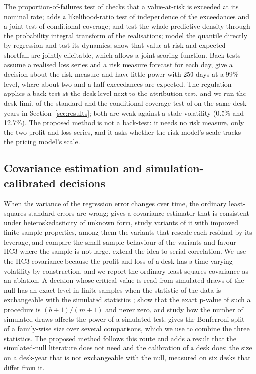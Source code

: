The proportion-of-failures test of \citet{kupiec1995} checks that a value-at-risk is exceeded at its nominal rate; \citet{christoffersen1998} adds a likelihood-ratio test of independence of the exceedances and a joint test of conditional coverage; \citet{berkowitz2001} and \citet{diebold1998} test the whole predictive density through the probability integral transform of the realisations; \citet{engle2004} model the quantile directly by regression and test its dynamics; \citet{fissler2016} show that value-at-risk and expected shortfall are jointly elicitable, which allows a joint scoring function.
Back-tests assume a realised loss series and a risk measure forecast for each day, give a decision about the risk measure and have little power with 250 days at a 99\% level, where about two and a half exceedances are expected.
The regulation applies a back-test at the desk level next to the attribution test, and we run the desk limit of the standard and the conditional-coverage test of \citet{christoffersen1998} on the same desk-years in Section~\ref{sec:results}; both are weak against a stale volatility (0.5\% and 12.7\%).
The proposed method is not a back-test: it needs no risk measure, only the two profit and loss series, and it asks whether the risk model's scale tracks the pricing model's scale.

\subsection{Covariance estimation and simulation-calibrated decisions}
\label{sec:rw-calibration}

When the variance of the regression error changes over time, the ordinary least-squares standard errors are wrong; \citet{white1980} gives a covariance estimator that is consistent under heteroskedasticity of unknown form, \citet{mackinnon1985} study variants of it with improved finite-sample properties, among them the variants that rescale each residual by its leverage, and \citet{long2000} compare the small-sample behaviour of the variants and favour HC3 where the sample is not large.
\citet{neweywest1987} extend the idea to serial correlation.
We use the HC3 covariance because the profit and loss of a desk has a time-varying volatility by construction, and we report the ordinary least-squares covariance as an ablation.
A decision whose critical value is read from simulated draws of the null has an exact level in finite samples when the statistic of the data is exchangeable with the simulated statistics \citep{dufour2006}; \citet{phipson2010} show that the exact p-value of such a procedure is $(b+1)/(m+1)$ and never zero, and \citet{davidson2000} study how the number of simulated draws affects the power of a simulated test.
\citet{dunn1961} gives the Bonferroni split of a family-wise size over several comparisons, which we use to combine the three statistics.
The proposed method follows this route and adds a result that the simulated-null literature does not need and the calibration of a desk does: the size on a desk-year that is not exchangeable with the null, measured on six desks that differ from it.

